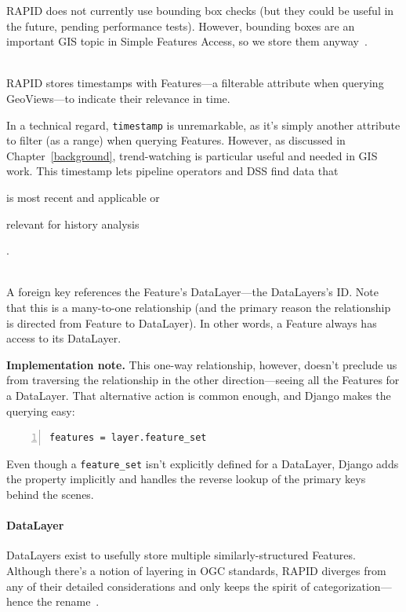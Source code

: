 \begin{description}
  RAPID does not currently use bounding box checks (but they could be useful in the future, pending performance tests). However, bounding boxes are an important GIS topic in Simple Features Access, so we store them anyway~\cite{SFA}.
  
\item[Timestamp] \hfill \\
RAPID stores timestamps with Features---a filterable attribute when querying GeoViews---to indicate their relevance in time.

In a technical regard, \texttt{timestamp} is unremarkable, as it's simply another attribute to filter (as a range) when querying Features. However, as discussed in Chapter~\ref{background}, trend-watching is particular useful and needed in GIS work. This timestamp lets pipeline operators and DSS find data that \begin{enumerate*}[label=\itshape\alph*\upshape)]
\item is most recent and applicable or
\item relevant for history analysis
\end{enumerate*}.
  
\item[DataLayer foreign key] \hfill \\
A foreign key references the Feature's DataLayer---the DataLayers's ID. Note that this is a many-to-one relationship (and the primary reason the relationship is directed from Feature to DataLayer). In other words, a Feature always has access to its DataLayer.

\textbf{Implementation note.} This one-way relationship, however, doesn't preclude us from traversing the relationship in the other direction---seeing all the Features for a DataLayer. That alternative action is common enough, and Django makes the querying easy: 

\begin{Verbatim}[samepage=true,baselinestretch=1,numbers=left,xleftmargin=12mm]
features = layer.feature_set
\end{Verbatim}

Even though a \texttt{feature\_set} isn't explicitly defined for a DataLayer, Django adds the property implicitly and handles the reverse lookup of the primary keys behind the scenes.

\end{description}

\paragraph{DataLayer}
DataLayers exist to usefully store multiple similarly-structured Features. Although there's a notion of layering in OGC standards, RAPID diverges from any of their detailed considerations and only keeps the spirit of categorization---hence the rename~\cite{AbstractSpecFaq,SFA,WFS}.

